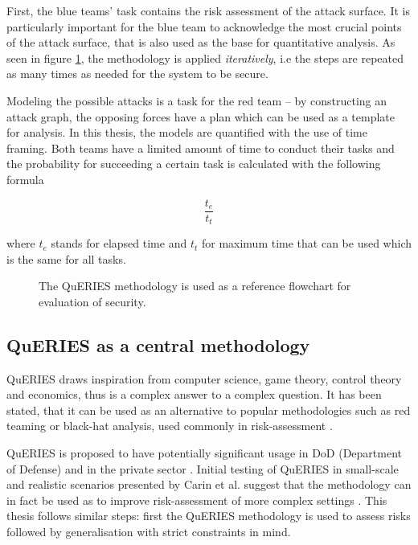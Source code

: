 First, the blue teams' task contains the risk assessment of the attack
surface. It is particularly important for the blue team to acknowledge
the most crucial points of the attack surface, that is also used as
the base for quantitative analysis. As seen in figure
\ref{queries}, the methodology is applied \textit{iteratively}, i.e
the steps are repeated as many times as needed for the system to be
secure.

Modeling the possible attacks is a task for the red team – by
constructing an attack graph, the opposing forces have a plan which
can be used as a template for analysis. In this thesis, the models are quantified with the use of time
framing. Both teams have a limited amount of time to conduct their
tasks and the probability for succeeding a certain task is calculated
with the following formula

\[ \frac{t_e}{t_t} \]

where \(t_e\) stands for elapsed time and \(t_t\) for maximum time
that can be used which is the same for all tasks.

\begin{figure}[t!]
\centerline{}
\caption[QuERIES as a flowchart]{The QuERIES methodology is used as a reference flowchart for
  evaluation of security. \cite{hughes2013quantitative}}
\label{queries}
\end{figure}
\subsection{QuERIES as a central methodology} \label{queriesasmethodology}

QuERIES draws inspiration from computer science, game theory, control
theory and economics, thus is a complex answer to a complex
question. It has been stated, that it can be used as an alternative to
popular methodologies such as red teaming or black-hat analysis, used
commonly in risk-assessment \cite{carin2008cybersecurity}.

QuERIES is proposed to have potentially significant usage in DoD
(Department of Defense) and in the private sector
\cite{carin2008cybersecurity}. Initial testing of QuERIES in
small-scale and realistic scenarios presented by Carin et al. suggest
that the methodology can in fact be used as to improve risk-assessment of
more complex settings \cite{carin2008cybersecurity}. This thesis
follows similar steps: first the QuERIES methodology is used to assess
risks followed by generalisation with strict constraints in mind.

